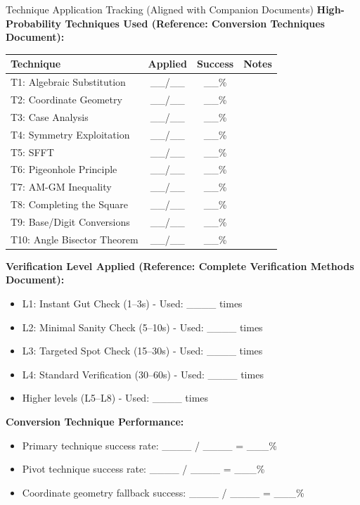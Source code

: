 \documentclass{article}
\begin{document}
\begin{analysisbox}{Technique Application Tracking (Aligned with Companion Documents)}
\textbf{High-Probability Techniques Used (Reference: Conversion Techniques Document):}
\begin{center}
\begin{tabular}{|l|c|c|l|}
\hline
\textbf{Technique} & \textbf{Applied} & \textbf{Success} & \textbf{Notes} \\
\hline
T1: Algebraic Substitution & \_\_/\_\_ & \_\_\% & \\
T2: Coordinate Geometry & \_\_/\_\_ & \_\_\% & \\
T3: Case Analysis & \_\_/\_\_ & \_\_\% & \\
T4: Symmetry Exploitation & \_\_/\_\_ & \_\_\% & \\
T5: SFFT & \_\_/\_\_ & \_\_\% & \\
T6: Pigeonhole Principle & \_\_/\_\_ & \_\_\% & \\
T7: AM-GM Inequality & \_\_/\_\_ & \_\_\% & \\
T8: Completing the Square & \_\_/\_\_ & \_\_\% & \\
T9: Base/Digit Conversions & \_\_/\_\_ & \_\_\% & \\
T10: Angle Bisector Theorem & \_\_/\_\_ & \_\_\% & \\
\hline
\end{tabular}
\end{center}

\textbf{Verification Level Applied (Reference: Complete Verification Methods Document):}
\begin{itemize}[nosep]
\item[$\square$] L1: Instant Gut Check (1--3s) - Used: \_\_\_\_ times
\item[$\square$] L2: Minimal Sanity Check (5--10s) - Used: \_\_\_\_ times
\item[$\square$] L3: Targeted Spot Check (15--30s) - Used: \_\_\_\_ times
\item[$\square$] L4: Standard Verification (30--60s) - Used: \_\_\_\_ times
\item[$\square$] Higher levels (L5--L8) - Used: \_\_\_\_ times
\end{itemize}

\textbf{Conversion Technique Performance:}
\begin{itemize}[nosep]
\item Primary technique success rate: \_\_\_\_ / \_\_\_\_ = \_\_\_\%
\item Pivot technique success rate: \_\_\_\_ / \_\_\_\_ = \_\_\_\%
\item Coordinate geometry fallback success: \_\_\_\_ / \_\_\_\_ = \_\_\_\%
\end{itemize}
\end{analysisbox}
\end{document}
